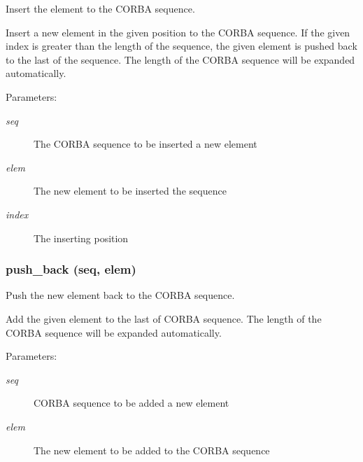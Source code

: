 Insert the element to the CORBA sequence. 

Insert a new element in the given position to the CORBA sequence. If the given index is greater than the length of the sequence, the given element is pushed back to the last of the sequence. The length of the CORBA sequence will be expanded automatically.

\begin{Desc}
\item[Parameters:]
\begin{description}
\item[{\em seq}]The CORBA sequence to be inserted a new element \item[{\em elem}]The new element to be inserted the sequence \item[{\em index}]The inserting position\end{description}
\end{Desc}
\subsubsection{\setlength{\rightskip}{0pt plus 5cm}push\_\-back (seq, elem)}\label{CORBA__SeqEx_8py_a2}


Push the new element back to the CORBA sequence. 

Add the given element to the last of CORBA sequence. The length of the CORBA sequence will be expanded automatically.

\begin{Desc}
\item[Parameters:]
\begin{description}
\item[{\em seq}]CORBA sequence to be added a new element \item[{\em elem}]The new element to be added to the CORBA sequence\end{description}
\end{Desc}
